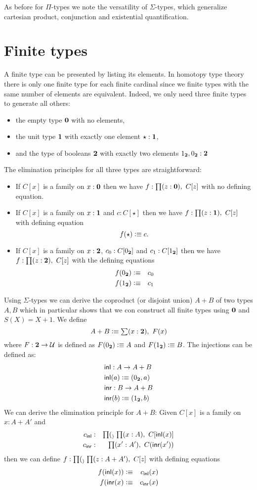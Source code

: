 As before for $\Pi$-types we note the versatility of $\Sigma$-types,
which generalize cartesian product, conjunction and existential
quantification. 

\section{Finite types}
\label{sec:finite-types}

A finite type can be presented by listing its elements. In homotopy
type theory there is only one finite type for each finite cardinal
since we finite types with the same number of elements are equivalent.
Indeed, we only need three finite types to generate all others: 
\begin{itemize}
\item the empty type $\mathbf{0}$ with no elements,
\item the unit type $\mathbf{1}$ with exactly one element $\star:\mathbf{1}$,
\item and the type of booleans $\mathbf{2}$ with exactly two elements
  $1_{\mathbf{2}},0_{\mathbf{2}} : \mathbf{2}$
\end{itemize}
The elimination principles for all three types are straightforward:
\begin{itemize}
\item If $C[x]$ is a family on $x:\mathbf{0}$ then we have $f:\prd{z:\emptyt}C[z]$ with no defining equation.
\item If $C[x]$ is a family on $x:\mathbf{1}$ and $c:C[\star]$ then we have $f:\prd{z:\unit}C[z]$ with defining equation
  \[ f(\star)\vcentcolon\equiv c.\]
\item If $C[x]$ is a family on $x:\mathbf{2}$, $c_0:C[0_{\mathbf{2}}]$ 
and $c_1:C[1_{\mathbf{2}}]$ then we have $f:\prd{z:\bool}C[z]$ with the
defining equations
\begin{eqnarray*}
f(0_{\mathbf{2}}) & \vcentcolon\equiv& c_0\\
f(1_{\mathbf{2}}) & \vcentcolon\equiv & c_1
\end{eqnarray*}
\end{itemize}
Using $\Sigma$-types we can derive the coproduct (or disjoint union) $A+B$
of two types $A,B$ which in particular shows that we con construct all
finite types using $\mathbf{0}$ and $S(X) = X+1$. We define
\[A + B \defeq \sm{x:\bool}F(x)\]
where $F : \mathbf{2} \to \mathcal{U}$ is
defined as $F(0_{\mathbf{2}}) \vcentcolon\equiv A$ and $F(1_{\mathbf{2}})\vcentcolon\equiv B$. The
injections can be defined as:
\begin{align*}
& \mathsf{inl} :  A \to A+B\\
& \mathsf{inl}(a) \vcentcolon\equiv (0_{\mathbf{2}},a)\\
& \mathsf{inr} :  B \to A+B\\
& \mathsf{inr}(b) \vcentcolon\equiv (1_{\mathbf{2}},b)
\end{align*}
We can derive the elimination principle for $A+B$:
Given  $C[x]$ is a family on $x:A+A'$ and
\begin{eqnarray*}
c_\inl & : & \prd_{x:A}C[\inl(x)] \\
c_\inr & : & \prd{x':A'}C(\inr(x'))
\end{eqnarray*}
then we can define $f:\prd_{z:A+A'}C[z]$ with defining equations
\begin{eqnarray*}
f(\mathsf{inl}(x)) & \vcentcolon\equiv& c_\mathsf{inl}(x)  \\
f(\mathsf{inr}(x) & \vcentcolon\equiv & c_\mathsf{inr}(x)  
\end{eqnarray*}

